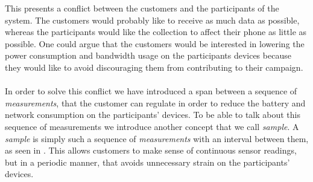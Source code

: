 
This presents a conflict between the customers and the participants of the system. The customers would probably like to receive as much data as possible, whereas the participants would like the collection to affect their phone as little as possible. One could argue that the customers would be interested in lowering the power consumption and bandwidth usage on the participants devices because they would like to avoid discouraging them from contributing to their campaign. 
\\\\
In order to solve this conflict we have introduced a span between a sequence of \emph{measurements}, that the customer can regulate in order to reduce the battery and network consumption on the participants' devices. To be able to talk about this sequence of measurements we introduce another concept that we call \emph{sample}. A \emph{sample} is simply such a sequence of \emph{measurements} with an interval between them, as seen in . This allows customers to make sense of continuous sensor readings, but in a periodic manner, that avoids unnecessary strain on the participants' devices.






